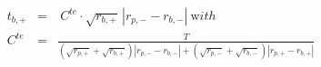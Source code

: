 


\begin{eqnarray*}
  t_{b,+} & = & \ C^{te} \cdot \sqrt{r_{b,+}}\,\left| r_{p,-} - r_{b,-} \right|
                \ {\mathrm with}
\\
   C^{te} & = & \frac{T}
                 {\left( \sqrt{r_{p,+}} + \sqrt{r_{b,+}} \right)
                  \left| r_{p,-} - r_{b,-} \right| + 
                  \left( \sqrt{r_{p,-}} + \sqrt{r_{b,-}} \right)
                  \left| r_{p,+} - r_{b,+} \right|}
\end{eqnarray*}

